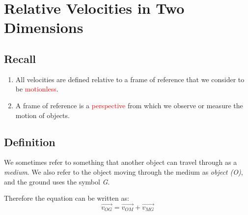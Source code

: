 \section{Relative Velocities in Two Dimensions}
\subsection{Recall}
\begin{enumerate}
    \item All velocities are defined relative to a frame of reference that we consider to be \textcolor{red}{motionless}.
    \item A frame of reference is a \textcolor{red}{perspective} from which we observe or measure the motion of objects.
\end{enumerate}
\subsection{Definition}
We sometimes refer to something that another object can travel through as a \textit{medium}. We also refer to the object moving through the medium as \textit{object (O)}, and the ground uses the symbol \textit{G}.

Therefore the equation can be written as:
\[
\vec{v_{OG}} = \vec{v_{OM}} + \vec{v_{MG}}
\]

